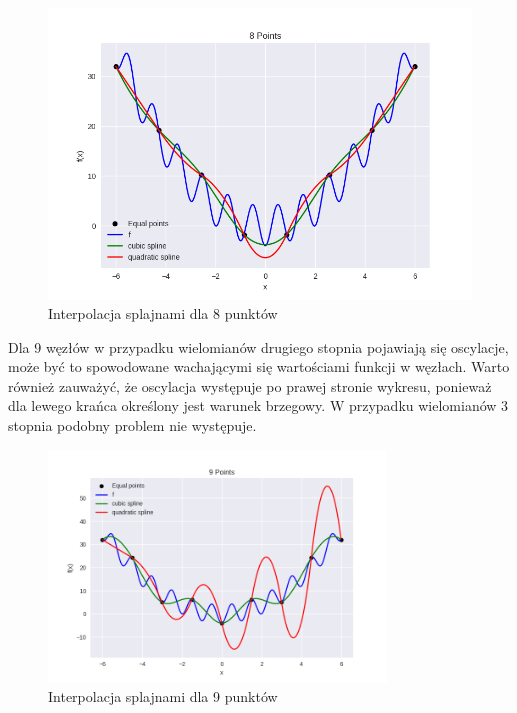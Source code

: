 \documentclass{article}
\begin{document}
\begin{figure}[H]
    \centering
    \includegraphics[width=\textwidth]{img/spline_8.png}
    \caption{Interpolacja splajnami dla 8 punktów}
\end{figure}

Dla 9 węzłów w przypadku wielomianów drugiego stopnia pojawiają się oscylacje, może być to spowodowane
wachającymi się wartościami funkcji w węzłach. Warto również zauważyć, że oscylacja występuje po prawej stronie wykresu, 
ponieważ dla lewego krańca określony jest warunek brzegowy. W przypadku wielomianów 3 stopnia podobny problem nie występuje.

\begin{figure}[H]
    \centering
    \includegraphics[width=0.8\textwidth]{img/spline_9.png}
    \caption{Interpolacja splajnami dla 9 punktów}
\end{figure}
\end{document}

